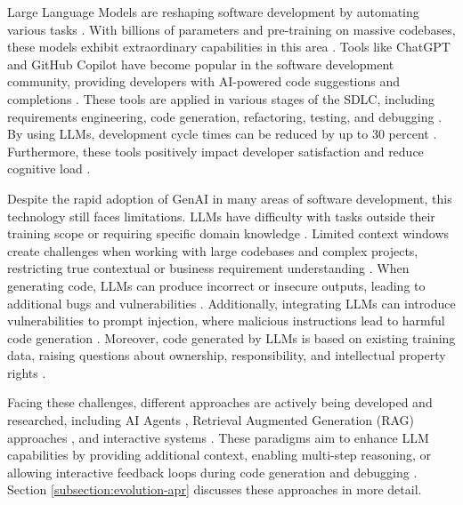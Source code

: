Large Language Models are reshaping software development by automating various tasks \cite{houLargeLanguageModels2024}. With billions of parameters and pre-training on massive codebases, these models exhibit extraordinary capabilities in this area \cite{chenUnveilingPitfallsUnderstanding2025}. Tools like ChatGPT \cite{IntroducingChatGPT2024} and GitHub Copilot \cite{dohmkeGitHubCopilotMeet2025} have become popular in the software development community, providing developers with AI-powered code suggestions and completions \cite{bhargavmallampatiRoleGenerativeAI2025}. These tools are applied in various stages of the \ac{SDLC}, including requirements engineering, code generation, refactoring, testing, and debugging \cite{houLargeLanguageModels2024, puvvadiCodingAgentsComprehensive2025, bhargavmallampatiRoleGenerativeAI2025}. By using \acp{LLM}, development cycle times can be reduced by up to 30 percent \cite{bhargavmallampatiRoleGenerativeAI2025, kalliamvakouResearchQuantifyingGitHub2022}. Furthermore, these tools positively impact developer satisfaction and reduce cognitive load \cite{kalliamvakouResearchQuantifyingGitHub2022}.

Despite the rapid adoption of \ac{GenAI} in many areas of software development, this technology still faces limitations. \acp{LLM} have difficulty with tasks outside their training scope or requiring specific domain knowledge \cite{houLargeLanguageModels2024}. Limited context windows create challenges when working with large codebases and complex projects, restricting true contextual or business requirement understanding \cite{bhargavmallampatiRoleGenerativeAI2025}. When generating code, \acp{LLM} can produce incorrect or insecure outputs, leading to additional bugs and vulnerabilities \cite{houLargeLanguageModels2024, bhargavmallampatiRoleGenerativeAI2025}. Additionally, integrating \acp{LLM} can introduce vulnerabilities to prompt injection, where malicious instructions lead to harmful code generation \cite{liuPromptInjectionAttack2024}. Moreover, code generated by \acp{LLM} is based on existing training data, raising questions about ownership, responsibility, and intellectual property rights \cite{sauvolaFutureSoftwareDevelopment2024, houLargeLanguageModels2024}.

Facing these challenges, different approaches are actively being developed and researched, including AI Agents \cite{liuMarsCodeAgentAInative2024, yangSWEagentAgentComputerInterfaces2024}, Retrieval Augmented Generation (RAG) approaches \cite{xiaAgentlessDemystifyingLLMbased2024}, and interactive systems \cite{xiaAutomatedProgramRepair2024}. These paradigms aim to enhance LLM capabilities by providing additional context, enabling multi-step reasoning, or allowing interactive feedback loops during code generation and debugging \cite{houLargeLanguageModels2024, puvvadiCodingAgentsComprehensive2025}. Section \ref{subsection:evolution-apr} discusses these approaches in more detail.

